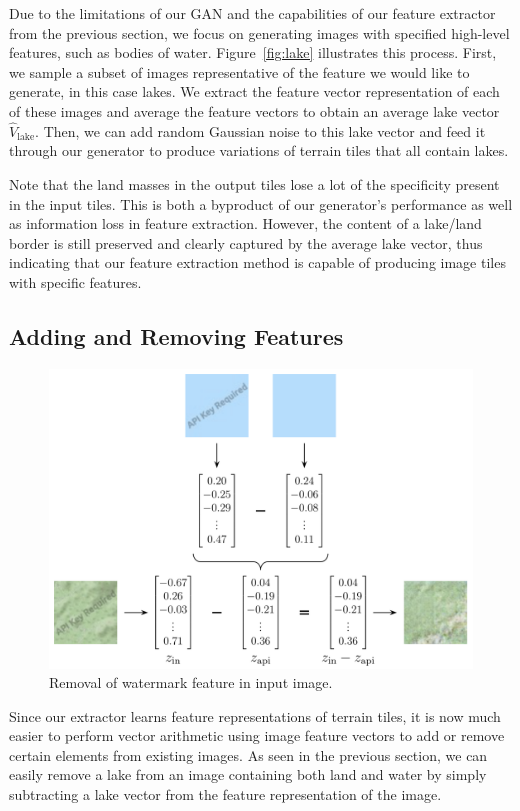 \documentclass[11pt,twocolumn,letterpaper]{article}
\begin{document}
Due to the limitations of our GAN and the capabilities of our feature extractor from the previous section, we focus on generating images with specified high-level features, such as bodies of water. Figure~\ref{fig:lake} illustrates this process. First, we sample a subset of images representative of the feature we would like to generate, in this case lakes. We extract the feature vector representation of each of these images and average the feature vectors to obtain an average lake vector $\hat{V}_{\text{lake}}$. Then, we can add random Gaussian noise to this lake vector and feed it through our generator to produce variations of terrain tiles that all contain lakes.

Note that the land masses in the output tiles lose a lot of the specificity present in the input tiles. This is both a byproduct of our generator's performance as well as information loss in feature extraction. However, the content of a lake/land border is still preserved and clearly captured by the average lake vector, thus indicating that our feature extraction method is capable of producing image tiles with specific features.

\subsection{Adding and Removing Features}

\begin{figure}[ht]
    \centering
    \includegraphics[width=0.75\linewidth]{imgs/api.png}
    \caption{Removal of watermark feature in input image.}
  \label{fig:api}
\end{figure}

Since our extractor learns feature representations of terrain tiles, it is now much easier to perform vector arithmetic using image feature vectors to add or remove certain elements from existing images. As seen in the previous section, we can easily remove a lake from an image containing both land and water by simply subtracting a lake vector from the feature representation of the image.
\end{document}
